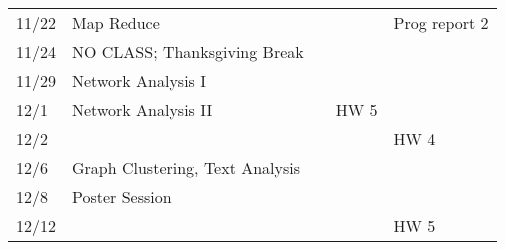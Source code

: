 \documentclass[11pt]{article}
\begin{document}
\begin{centering}
\begin{tabular}{||l|p{3in}|l|l|l||}
11/22 & Map Reduce &  & &Prog report 2\\ 
11/24 & NO CLASS; Thanksgiving Break  & & & \\ 
 \hline

11/29 & Network Analysis I &  & & \\ 
12/1 & Network Analysis II &&HW 5 &\\
12/2 &&&& HW 4\\
\hline 

12/6 & Graph Clustering, Text Analysis  & & & \\ 
12/8 & Poster Session &  &  &\\ 
\hline 
12/12 &&&& HW 5\\

\hline\hline


\end{tabular}\\
\end{centering}
\end{document}
